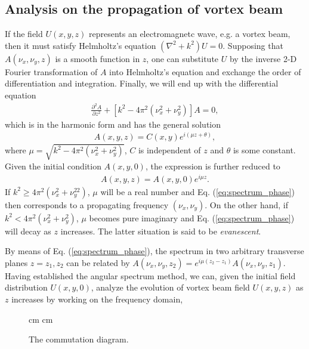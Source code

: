 \subsection{Analysis on the propagation of vortex beam}
If the field $U(x, y, z)$ represents an electromagnetc wave, e.g. a vortex beam, then it must satisfy Helmholtz's equation $(\nabla^2 + k^2) U  = 0$. Supposing that $A(\nu_x, \nu_y, z)$ is a smooth function in $z$, one can substitute $U$ by the inverse 2-D Fourier transformation of $A$ into Helmholtz's equation and exchange the order of differentiation and integration. Finally, we will end up with the differential equation
\begin{eqnarray}
	\frac{\partial^2 A}{\partial z^2} + \left[ k^2 - 4\pi^2\left( \nu_x^2 + \nu_y^2 \right) \right] A= 0,
	\nonumber
\end{eqnarray}
which is in the harmonic form and has the general solution
\begin{eqnarray}
	A(x, y, z) = C(x, y) e^{i (\mu z + \theta)},
	\nonumber
\end{eqnarray}
where $\mu = \sqrt{k^2 - 4\pi^2\left( \nu_x^2 + \nu_y^2 \right)}$, $C$ is independent of $z$ and $\theta$ is some constant. Given the initial condition $A(x, y, 0)$, the expression is further reduced to
\begin{eqnarray}
	A(x, y, z) = A(x, y, 0) e^{i \mu z}.
	\label{eq:spectrum_phase}
\end{eqnarray}
If $k^2 \ge 4\pi^2 (\nu_x^2 + \nu_y^22)$, $\mu$ will be a real number and Eq. (\ref{eq:spectrum_phase}) then corresponds to a propagating frequency $(\nu_x, \nu_y)$. On the other hand, if $k^2 < 4\pi^2 (\nu_x^2 + \nu_y^2)$, $\mu$ becomes pure imaginary and Eq. (\ref{eq:spectrum_phase}) will decay as $z$ increases. The latter situation is said to be {\em evanescent}.

By means of Eq. (\ref{eq:spectrum_phase}), the spectrum in two arbitrary transverse planes $z = z_1, z_2$ can be related by $A(\nu_x, \nu_y, z_2) = e^{i \mu (z_2 - z_1)} A(\nu_x, \nu_y, z_1)$. Having established the angular spectrum method, we can, given the initial field distribution $U(x, y, 0)$, analyze the evolution of vortex beam field $U(x, y, z)$ as $z$ increases by working on the frequency domain,

\begin{figure}[h]
	 cm
	 cm
	\caption{The commutation diagram.}
	\label{fig:commu_diag}
\end{figure}

